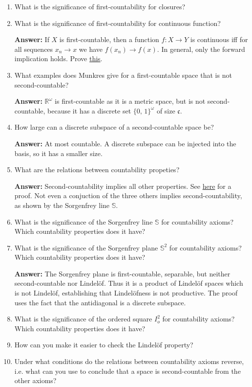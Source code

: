 \begin{enumerate}
    \item What is the significance of first-countability for closures?
    \item What is the significance of first-countability for continuous function?

    \textbf{Answer:} If \( X \) is first-countable, then a function \( f: X \to Y \) is continuous iff for all sequences \( x_n \to x \) we have \( f(x_n) \to f(x) \). In general, only the forward implication holds. Prove \hyperlink{FirstCountableContinuousFunctions}{this}.
    
    \item What examples does Munkres give for a first-countable space that is not second-countable?

        \textbf{Answer:} \( \mathbb{R}^\omega \) is first-countable as it is a metric space, but is not second-countable, because it has a discrete set \( \{ 0,\,1 \}^\omega \) of size \( \mathfrak{c} \).
    \item How large can a discrete subspace of a second-countable space be?
    
    \textbf{Answer:} At most countable. A discrete subspace can be injected into the basis, so it has a smaller size.
    \item What are the relations between countability propeties?

    \textbf{Answer:} Second-countability implies all other properties. See \hyperlink{MetrisableSpaceCountabilityProperties}{here} for a proof. Not even a conjuction of the three others implies second-countability, as shown by the Sorgenfrey line \( \mathbb{S} \).
    \item What is the significance of the Sorgenfrey line \( \mathbb{S} \) for countability axioms? Which countability properties does it have?
    \item What is the significance of the Sorgenfrey plane \( \mathbb{S}^2 \) for countability axioms? Which countability properties does it have?

        \textbf{Answer:}  The Sorgenfrey plane is first-countable, separable, but neither second-countable nor Lindel\"of. Thus it is a product of Lindel\"of spaces which is not Lindel\"of, establishing that Lindel\"ofness is not productive. The proof uses the fact that the antidiagonal is a discrete subspace.

    \item What is the significance of the ordered square \( I_o^2 \) for countability axioms? Which countability properties does it have?
    \item How can you make it easier to check the Lindel\"of property?
    \item Under what conditions do the relations between countability axioms reverse, i.e. what can you use to conclude that a space is second-countable from the other axioms?
    

\end{enumerate}
